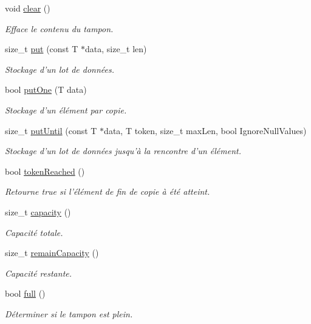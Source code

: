 \begin{DoxyCompactItemize}
void \hyperlink{classmdt_buffer_a697920838a6c786209607c2b6ac0858a}{clear} ()
\begin{DoxyCompactList}\small\item\em Efface le contenu du tampon. \end{DoxyCompactList}\item 
size\_\-t \hyperlink{classmdt_buffer_abe03f0413ff7512d63d8df1408c66f63}{put} (const T $\ast$data, size\_\-t len)
\begin{DoxyCompactList}\small\item\em Stockage d'un lot de données. \end{DoxyCompactList}\item 
bool \hyperlink{classmdt_buffer_a2b9fd3a6b593c2e874249aba5c305e34}{putOne} (T data)
\begin{DoxyCompactList}\small\item\em Stockage d'un élément par copie. \end{DoxyCompactList}\item 
size\_\-t \hyperlink{classmdt_buffer_a01d74092785c9442014ee34624ffa96f}{putUntil} (const T $\ast$data, T token, size\_\-t maxLen, bool IgnoreNullValues)
\begin{DoxyCompactList}\small\item\em Stockage d'un lot de données jusqu'à la rencontre d'un élément. \end{DoxyCompactList}\item 
bool \hyperlink{classmdt_buffer_a6ddc3c27c154fbfd077f83d5bfe82a19}{tokenReached} ()
\begin{DoxyCompactList}\small\item\em Retourne true si l'élément de fin de copie à été atteint. \end{DoxyCompactList}\item 
size\_\-t \hyperlink{classmdt_buffer_aa6eddf7ccc533da855ebd112202a656f}{capacity} ()
\begin{DoxyCompactList}\small\item\em Capacité totale. \end{DoxyCompactList}\item 
size\_\-t \hyperlink{classmdt_buffer_a78e8317b6ba09e9c4e26358e27f75fd6}{remainCapacity} ()
\begin{DoxyCompactList}\small\item\em Capacité restante. \end{DoxyCompactList}\item 
bool \hyperlink{classmdt_buffer_a63e2b6b5e7656a5285d0ea1d152ea499}{full} ()
\begin{DoxyCompactList}\small\item\em Déterminer si le tampon est plein. \end{DoxyCompactList}\item 

\end{DoxyCompactItemize}
